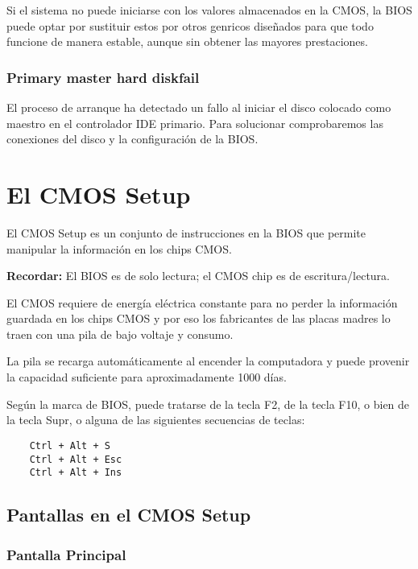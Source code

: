 \documentclass[12pt,oneside,a4paper]{article}
\begin{document}
		Si el sistema no puede iniciarse con los valores almacenados en la
		CMOS, la BIOS puede optar por sustituir estos por otros genricos
		diseñados para que todo funcione de manera estable, aunque sin
		obtener las mayores prestaciones. 

		\subsubsection{Primary master hard diskfail}

		El proceso de arranque ha detectado un fallo al iniciar el disco
		colocado como maestro en el controlador IDE primario. Para
		solucionar comprobaremos las conexiones del disco y la
		configuración de la BIOS. 
	

	\newpage
	\newpage
\section{El CMOS Setup}{\label{sec:cmossetup}}

	El CMOS Setup es un conjunto de instrucciones en la BIOS que permite
	manipular la información en los chips CMOS.

	{\bf Recordar:} El BIOS es de solo lectura; el CMOS chip es de escritura/lectura.

	El CMOS requiere de energía eléctrica constante para no perder la
	información guardada en los chips CMOS y por eso los fabricantes de las
	placas madres lo traen con una pila de bajo voltaje y consumo.

	La pila se recarga automáticamente al encender la computadora y puede
	provenir la capacidad suficiente para aproximadamente 1000 días.

	Según la marca de BIOS, puede tratarse de la tecla F2, de la tecla F10, o
	bien de la tecla Supr, o alguna de las siguientes secuencias de teclas: 

	\begin{verbatim}
	Ctrl + Alt + S 
	Ctrl + Alt + Esc 
	Ctrl + Alt + Ins 
	\end{verbatim}

	\newpage
	\subsection{Pantallas en el CMOS Setup}{\label{sub:pantallas en el cmos setup}}

		\subsubsection{Pantalla Principal}{\label{sub:pantalla principal}}
			
\end{document}
